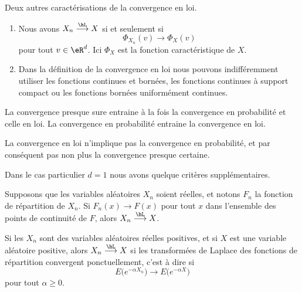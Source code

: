 \begin{proposition}     \label{PrpopCaractCvL}
    Deux autres caractérisations de la convergence en loi.
    \begin{enumerate}
        \item
            Nous avons \( X_n\stackrel{\hL}{\longrightarrow}X\) si et seulement si
            \begin{equation}
                \Phi_{X_n}(v)\to\Phi_X(v)
            \end{equation}
            pour tout \( v\in\eR^d\). Ici \( \Phi_X\) est la fonction caractéristique de \( X\).
        \item
            Dans la définition de la convergence en loi nous pouvons indifféremment utiliser les fonctions continues et bornées, les fonctions continues à support compact ou les fonctions bornées uniformément continues.
    \end{enumerate}
\end{proposition}

\begin{proposition}
    La convergence presque sure entraine à la fois la convergence en probabilité et celle en loi. La convergence en probabilité entraine la convergence en loi.
\end{proposition}
La convergence en loi n'implique pas la convergence en probabilité, et par conséquent pas non plus la convergence presque certaine.

Dans le cas particulier \( d=1\) nous avons quelque critères supplémentaires. 

\begin{proposition}     \label{PropoFnrepCvL}
    Supposons que les variables aléatoires \( X_n\) soient réelles, et notons \( F_n\) la fonction de répartition de \( X_n\). Si \( F_n(x)\to F(x)\) pour tout \( x\) dans l'ensemble des points de continuité de \( F\), alors \( X_n\stackrel{\hL}{\longrightarrow}X\).
\end{proposition}

\begin{proposition}
    Si les \( X_n\) sont des variables aléatoires réelles positives, et si \( X\) est une variable aléatoire positive, alors \( X_n\stackrel{\hL}{\longrightarrow}X\) si les transformées de Laplace des fonctions de répartition convergent ponctuellement, c'est à dire si
    \begin{equation}
        E\big(  e^{-\alpha X_n} \big)\to E\big(  e^{-\alpha X} \big)
    \end{equation}
    pour tout \( \alpha\geq 0\).
\end{proposition}

